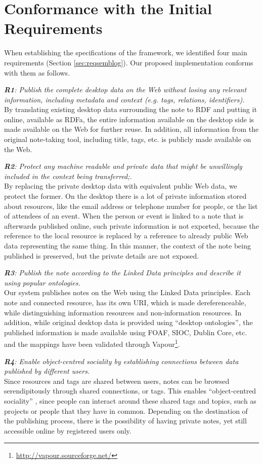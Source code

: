 \section{Conformance with the Initial Requirements}
\label{sec:evaluationsemblog}

When establishing the specifications of the framework, we identified four main requirements (Section \ref{sec:reqsemblog}).
Our proposed implementation conforms with them as follows.

\emph{\textbf{R1}: Publish the complete desktop data on the Web without losing any relevant information, including metadata and context (e.g. tags, relations, identifiers).}\\
By translating existing desktop data surrounding the note to RDF and putting it online, available as RDFa, the entire information available on the desktop side is made available on the Web for further reuse.
In addition, all information from the original note-taking tool, including title, tags, etc. is publicly made available on the Web.

\emph{\textbf{R2}: Protect any machine readable and private data that might be unwillingly included in the context being transferred;.}\\
By replacing the private desktop data with equivalent public Web data, we protect the former. On the desktop there is a lot of private information stored about resources, like the email address or telephone number for people, or the list of attendees of an event. When the person or event is linked to a note that is afterwards published online, such private information is not exported, because the reference to the local resource is replaced by a reference to already public Web data representing the same thing. In this manner, the context of the note being published is preserved, but the private details are not exposed.

\emph{\textbf{R3}: Publish the note according to the Linked Data principles and describe it using popular ontologies.}\\
Our system publishes notes on the Web using the Linked Data principles. Each note and connected resource, has its own URI, which is made dereferenceable, while distinguishing information resources and non-information resources.
In addition, while original desktop data is provided using ``desktop ontologies'', the published information is made available using FOAF, SIOC, Dublin Core, etc. and the mappings have been validated through Vapour\footnote{\url{http://vapour.sourceforge.net/}}.

\emph{\textbf{R4}: Enable object-centred sociality by establishing connections between data published by different users.}\\
Since resources and tags are shared between users, notes can be browsed serendipitously through shared connections, or tags. 
This enables ``object-centred sociality'' \cite{KnorrCetina1997}, since people can interact around these shared tags and topics, such as projects or people that they have in common.
Depending on the destination of the publishing process, there is the possibility of having private notes, yet still accessible online by registered users only.
